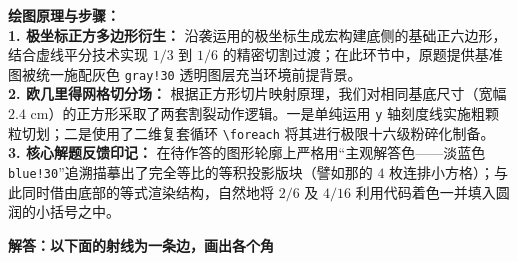 \vspace{0.4cm}
{\small\color{blue!70!black}
\textbf{绘图原理与步骤：}\\
\textbf{1. 极坐标正方多边形衍生：} 沿袭运用的极坐标生成宏构建底侧的基础正六边形，结合虚线平分技术实现 $1/3$ 到 $1/6$ 的精密切割过渡；在此环节中，原题提供基准图被统一施配灰色 \texttt{gray!30} 透明图层充当环境前提背景。\\
\textbf{2. 欧几里得网格切分场：} 根据正方形切片映射原理，我们对相同基底尺寸（宽幅 $2.4\text{ cm}$）的正方形采取了两套割裂动作逻辑。一是单纯运用 \texttt{y} 轴刻度线实施粗颗粒切划；二是使用了二维复套循环 \texttt{\textbackslash foreach} 将其进行极限十六级粉碎化制备。\\
\textbf{3. 核心解题反馈印记：} 在待作答的图形轮廓上严格用“主观解答色——淡蓝色 \texttt{blue!30}”追溯描摹出了完全等比的等积投影版块（譬如那的 $4$ 枚连排小方格）；与此同时借由底部的等式渲染结构，自然地将 $2/6$ 及 $4/16$ 利用代码着色一并填入圆润的小括号之中。
}






\newpage

\begin{center}
  {\large\bfseries 解答：以下面的射线为一条边，画出各个角}
\end{center}

\vspace{0.5cm}


